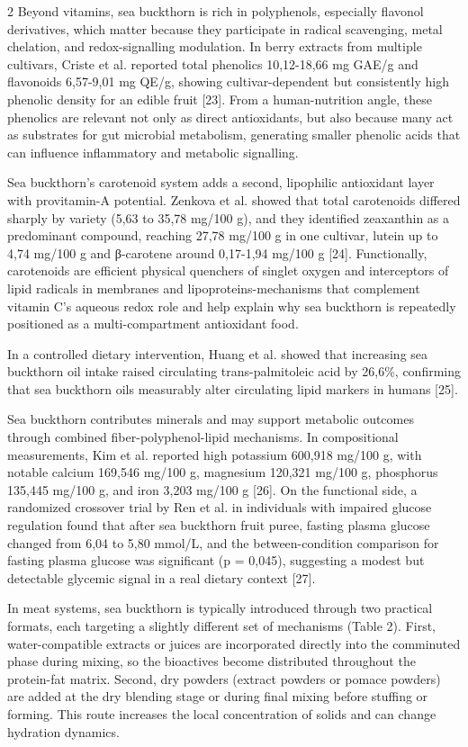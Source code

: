 \begin{multicols}{2}
Beyond vitamins, sea buckthorn is rich in polyphenols, especially
flavonol derivatives, which matter because they participate in radical
scavenging, metal chelation, and redox-signalling modulation. In berry
extracts from multiple cultivars, Criste et al. reported total phenolics
10,12-18,66 mg GAE/g and flavonoids 6,57-9,01 mg QE/g, showing
cultivar-dependent but consistently high phenolic density for an edible
fruit {[}23{]}. From a human-nutrition angle, these phenolics are
relevant not only as direct antioxidants, but also because many act as
substrates for gut microbial metabolism, generating smaller phenolic
acids that can influence inflammatory and metabolic signalling.

Sea buckthorn's carotenoid system adds a second, lipophilic antioxidant
layer with provitamin-A potential. Zenkova et al. showed that total
carotenoids differed sharply by variety (5,63 to 35,78 mg/100 g), and
they identified zeaxanthin as a predominant compound, reaching 27,78
mg/100 g in one cultivar, lutein up to 4,74 mg/100 g and β-carotene
around 0,17-1,94 mg/100 g {[}24{]}. Functionally, carotenoids are
efficient physical quenchers of singlet oxygen and interceptors of lipid
radicals in membranes and lipoproteins-mechanisms that complement
vitamin C's aqueous redox role and help explain why sea buckthorn is
repeatedly positioned as a multi-compartment antioxidant food.

In a controlled dietary intervention, Huang et al. showed that
increasing sea buckthorn oil intake raised circulating trans-palmitoleic
acid by 26,6\%, confirming that sea buckthorn oils measurably alter
circulating lipid markers in humans {[}25{]}.

Sea buckthorn contributes minerals and may support metabolic outcomes
through combined fiber-polyphenol-lipid mechanisms. In compositional
measurements, Kim et al. reported high potassium 600,918 mg/100 g,
with notable calcium 169,546 mg/100 g, magnesium 120,321 mg/100 g,
phosphorus 135,445 mg/100 g, and iron 3,203 mg/100 g {[}26{]}. On the
functional side, a randomized crossover trial by Ren et al. in
individuals with impaired glucose regulation found that after sea
buckthorn fruit puree, fasting plasma glucose changed from 6,04 to
5,80 mmol/L, and the between-condition comparison for fasting plasma
glucose was significant (p = 0,045), suggesting a modest but
detectable glycemic signal in a real dietary context {[}27{]}.

In meat systems, sea buckthorn is typically introduced through two
practical formats, each targeting a slightly different set of mechanisms
(Table 2). First, water-compatible extracts or juices are incorporated
directly into the comminuted phase during mixing, so the bioactives
become distributed throughout the protein-fat matrix. Second, dry
powders (extract powders or pomace powders) are added at the dry
blending stage or during final mixing before stuffing or forming. This
route increases the local concentration of solids and can change
hydration dynamics.


\end{multicols}
